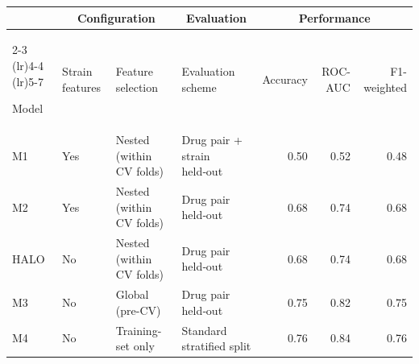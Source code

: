 \documentclass[10pt]{article}
\begin{document}
\begin{table}[t]
    \centering
    \scriptsize
    \setlength{\tabcolsep}{4pt}

    \begin{tabular}{@{} l l l p{3.2cm} r r r @{}}
        \toprule
        \multicolumn{1}{c}{}                       &
        \multicolumn{2}{c}{\textbf{Configuration}} &
        \multicolumn{1}{c}{\textbf{Evaluation}}    &
        \multicolumn{3}{c}{\textbf{Performance}}                                                                                                     \\
        \cmidrule(lr){2-3}
        \cmidrule(lr){4-4}
        \cmidrule(lr){5-7}

        Model
                                                   & Strain features
                                                   & Feature selection
                                                   & Evaluation scheme
                                                   & Accuracy
                                                   & ROC-AUC
                                                   & F1-weighted                                                                                     \\
        \midrule
        M1                                         & Yes               & Nested (within CV folds) & Drug pair + strain held‑out & 0.50 & 0.52 & 0.48 \\
        M2                                         & Yes               & Nested (within CV folds) & Drug pair held‑out          & 0.68 & 0.74 & 0.68 \\
        HALO                                       & No                & Nested (within CV folds) & Drug pair held‑out          & 0.68 & 0.74 & 0.68 \\
        M3                                         & No                & Global (pre-CV)          & Drug pair held‑out          & 0.75 & 0.82 & 0.75 \\
        M4                                         & No                & Training-set only        & Standard stratified split   & 0.76 & 0.84 & 0.76 \\
        \bottomrule
    \end{tabular}
\end{table}
\end{document}
